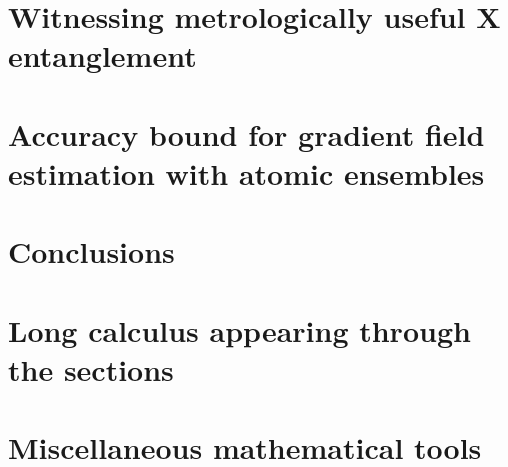 \documentclass[12pt, letterpaper, twoside]{article}
\numberwithin{equation}{section}
\numberwithin{figure}{section}
\numberwithin{table}{section}
\begin{document}


\section[Witnessing metrologically useful entanglement]
{Witnessing metrologically useful {\color{grey} X} entanglement}





\section[Metrology of the gradient magnetic field]
{Accuracy bound for gradient field estimation with atomic ensembles}





\section[Conclusions]
{Conclusions}






\appendix

\section{Long calculus appearing through the sections}


\section{Miscellaneous mathematical tools}



{}

\end{document}
